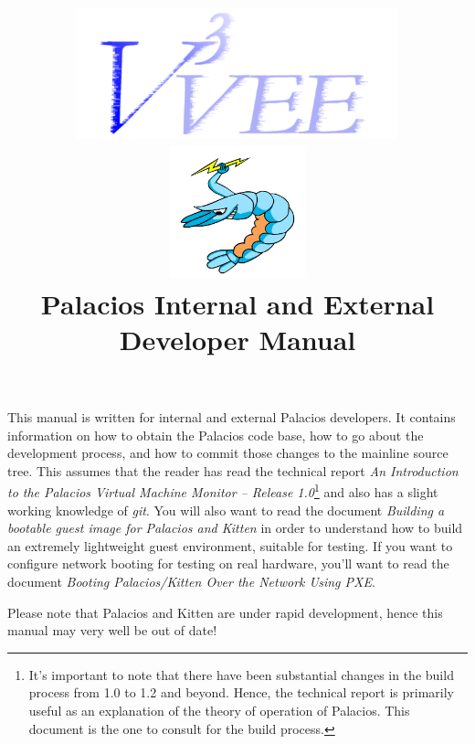 \documentclass[11pt]{article}
\begin{document}
\title{
\includegraphics[height=1.5in]{v3vee.pdf}
\includegraphics[height=1.5in]{logo6.png} \\
\vspace{0.5in} 
Palacios Internal and External Developer Manual
}


\maketitle


This manual is written for internal and external Palacios
developers. It contains information on how to obtain the Palacios code
base, how to go about the development process, and how to commit those
changes to the mainline source tree.  This assumes that the reader has
read the technical report {\em An Introduction to the Palacios Virtual
Machine Monitor -- Release 1.0}\footnote{It's important to note that
there have been substantial changes in the build process from 1.0 to
1.2 and beyond.  Hence, the technical report is primarily useful as an
explanation of the theory of operation of Palacios.  This document is
the one to consult for the build process.}  and also has a slight
working knowledge of {\em git}.  You will also want to read the
document {\em Building a bootable guest image for Palacios and Kitten}
in order to understand how to build an extremely lightweight guest
environment, suitable for testing.  If you want to configure network 
booting for testing on real hardware, you'll want to read the document
{\em Booting Palacios/Kitten Over the Network Using PXE}.

Please note that Palacios and Kitten are under rapid development,
hence this manual may very well be out of date!

\newpage
\tableofcontents
\newpage
\listoffigures
\newpage
\end{document}
